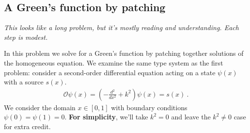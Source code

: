 \documentclass[12pt]{article}
\numberwithin{equation}{subsection}    %
\renewcommand{\tilde}{\widetilde}   %
\begin{document}
\subsection{A Green's function by patching}

\emph{This looks like a long problem, but it's mostly reading and understanding. Each step is modest.}


%
In this problem we solve for a Green's function by patching together solutions of the homogeneous equation.  We examine the same type system as the first problem: consider a second-order differential equation acting on a state $\psi(x)$ with a source $s(x)$. 
\begin{align*}
\mathcal O \psi(x) = 
	\left(-\frac{d^2}{dx^2} + k^2 \right) \psi(x) = s(x) \ .
\end{align*}
We consider the domain $x\in[0,1]$ with boundary conditions $\psi(0) = \psi(1) = 0$. \textbf{For simplicity}, we'll take $k^2 = 0$ and leave the $k^2 \neq 0$ case for extra credit.
\end{document}

